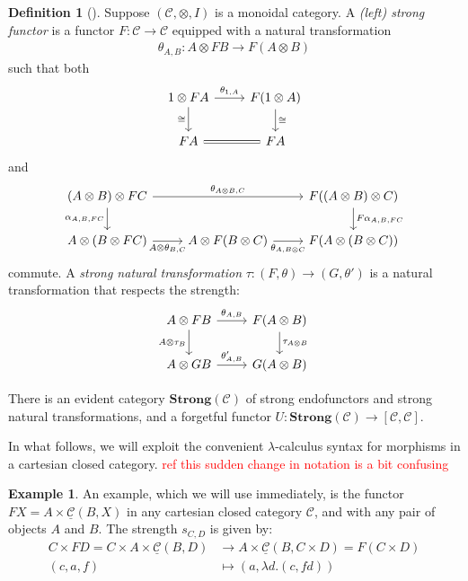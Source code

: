 \documentclass[11pt,a4paper]{article}
\theoremstyle{plain}
\theoremstyle{definition}
\newtheorem{definition}[theorem]{Definition}
\newtheorem{example}[theorem]{Example}
\newcommand{\C}{\mathscr{C}}
\newcommand{\homC}{\underline{\C}}
\newcommand{\Strong}{\mathbf{Strong}}
\newcommand{\todo}[1]{\textcolor{red}{\small #1}}
\begin{document}
\begin{definition}[\cite{StrongFunctors}]
  Suppose $(\C, \otimes, I)$ is a monoidal category.  A \emph{(left) strong functor} is a functor $F : \C \to \C$ equipped with a natural transformation
  \begin{align*}
    \theta_{A,B} : A \otimes F B \to F(A \otimes B)
  \end{align*}
  such that both
  \[
    \begin{tikzcd}
      1 \otimes F A \ar[r, "\theta_{1,A}"] \ar[d, "\cong" left]  & F(1 \otimes A) \ar[d, "\cong" right] \\
      F A \ar[r, equals] & F A
    \end{tikzcd}
  \]
  and
  \[
    \begin{tikzcd}
      (A \otimes B) \otimes F C \ar[rr, "\theta_{A \otimes B, C}"] \ar[d, "\alpha_{A,B,FC}" left]  && F((A \otimes B) \otimes C) \ar[d, "F\alpha_{A,B,FC}" right] \\
      A \otimes (B \otimes F C) \ar[r, "A \otimes \theta_{B,C}" below] & A \otimes F(B \otimes C) \ar[r, "\theta_{A, B\otimes C}" below] & F(A \otimes (B \otimes C))
    \end{tikzcd}
  \]
  commute. A \emph{strong natural transformation} $\tau : (F,\theta) \to (G,\theta')$ is a natural transformation that respects the strength:
  \[
    \begin{tikzcd}
      A \otimes F B \ar[r, "\theta_{A,B}"] \ar[d, "A \otimes \tau_B" left]  & F(A \otimes B) \ar[d, "\tau_{A \otimes B}" right] \\
      A \otimes G B \ar[r, "\theta'_{A, B}"]& G(A \otimes B)
    \end{tikzcd}
  \]

  There is an evident category $\Strong(\C)$ of strong endofunctors and strong natural transformations, and a forgetful functor $U : \Strong(\C) \to [\C, \C]$.
\end{definition}

In what follows, we will exploit the convenient $\lambda$-calculus syntax for morphisms in a cartesian closed category. \todo{ref} \todo{this sudden change in notation is a bit confusing}

\begin{example}
  An example, which we will use immediately, is the functor $FX = A \times \homC(B, X)$ in any cartesian closed category $\C$, and with any pair of objects $A$ and $B$. The strength $s_{C,D}$ is given by:
  \begin{align*}
    C \times FD = C \times A \times \homC(B, D) &\to A \times \homC(B, C \times D) = F(C \times D)\\
    (c, a, f) &\mapsto (a, \lambda d. (c, fd))
  \end{align*}
\end{example}
\end{document}
